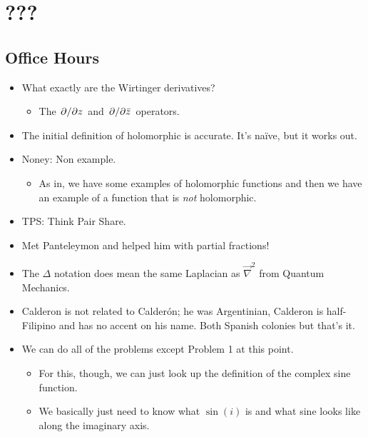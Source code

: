 \documentclass[../notes.tex]{subfiles}
\begin{document}
\chapter{???}
\section{Office Hours}
\begin{itemize}
    \item {}What exactly are the Wirtinger derivatives?
    \begin{itemize}
        \item The $\pdv*{z}$ and $\pdv*{\bar{z}}$ operators.
    \end{itemize}
    \item The initial definition of holomorphic is accurate. It's na\"{i}ve, but it works out.
    \item Noney: Non example.
    \begin{itemize}
        \item As in, we have some examples of holomorphic functions and then we have an example of a function that is \emph{not} holomorphic.
    \end{itemize}
    \item TPS: Think Pair Share.
    \item Met Panteleymon and helped him with partial fractions!
    \item The $\Delta$ notation does mean the same Laplacian as $\vec{\nabla}^2$ from Quantum Mechanics.
    \item Calderon is not related to Calder\'{o}n; he was Argentinian, Calderon is half-Filipino and has no accent on his name. Both Spanish colonies but that's it.
    \item We can do all of the problems except Problem 1 at this point.
    \begin{itemize}
        \item For this, though, we can just look up the definition of the complex sine function.
        \item We basically just need to know what $\sin(i)$ is and what sine looks like along the imaginary axis.
    \end{itemize}
\end{itemize}
\end{document}
